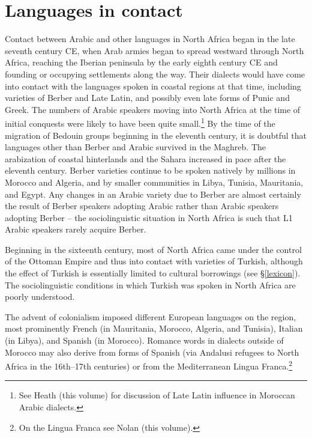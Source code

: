 \documentclass[output=paper]{langsci/langscibook}
\begin{document}
\section{ Languages in contact}

Contact between Arabic and other languages in North Africa began in the late seventh century CE, when Arab armies began to spread westward through North Africa, reaching the Iberian peninsula by the early eighth century CE and founding or occupying settlements along the way. Their dialects would have come into contact with the languages spoken in coastal regions at that time, including varieties of Berber and Late Latin, and possibly even late forms of Punic and Greek. The numbers of Arabic speakers moving into North Africa at the time of initial conquests were likely to have been quite small.\footnote{See Heath (this volume) for discussion of Late Latin influence in Moroccan Arabic dialects.} By the time of the migration of Bedouin groups beginning in the eleventh century, it is doubtful that languages other than Berber and Arabic survived in the Maghreb. The arabization of coastal hinterlands and the Sahara increased in pace after the eleventh century. Berber varieties continue to be spoken natively by millions in Morocco and Algeria, and by smaller communities in Libya, Tunisia, Mauritania, and Egypt. Any changes in an Arabic variety due to Berber are almost certainly the result of Berber speakers adopting Arabic rather than Arabic speakers adopting Berber -- the sociolinguistic situation in North Africa is such that L1 Arabic speakers rarely acquire Berber.

  Beginning in the sixteenth century, most of North Africa came under the control of the Ottoman Empire and thus into contact with varieties of Turkish, although the effect of Turkish is essentially limited to cultural borrowings (see §\ref{lexicon}). The sociolinguistic conditions in which Turkish was spoken in North Africa are poorly understood.

  The advent of colonialism imposed different European languages on the region, most prominently French (in Mauritania, Morocco, Algeria, and Tunisia), Italian (in Libya), and Spanish (in Morocco). Romance words in dialects outside of Morocco may also derive from forms of Spanish (via Andalusi refugees to North Africa in the 16th--17th centuries) or from the Mediterranean Lingua Franca.\footnote{On the Lingua Franca see Nolan (this volume).}
\end{document}
